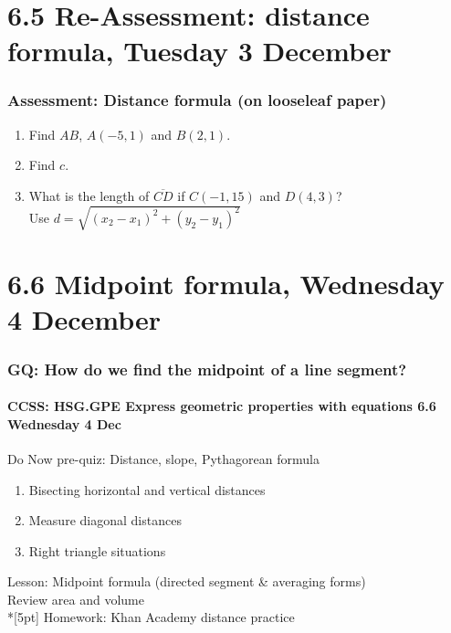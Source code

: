 \documentclass{beamer}
\begin{document}
  \section{6.5 Re-Assessment: distance formula, Tuesday 3 December}
  \frame
  {
    \frametitle{Assessment: Distance formula (on looseleaf paper)}
    \begin{enumerate}
      \item Find $AB$, $A(-5,1)$ and $B(2,1)$. \hspace{0.5cm}
         \vspace{1cm}
      \item Find $c$. \hspace{2cm}
         \vspace{0.5cm}
      \item What is the length of $\overline{CD}$ if $C(-1,15)$ and $D(4,3)$?\\[0.5cm]
        Use $\displaystyle d=\sqrt{(x_2-x_1)^2+(y_2-y_1)^2}$
    \end{enumerate}
  }

  \section{6.6 Midpoint formula, Wednesday 4 December}
  \frame
  {
    \frametitle{GQ: How do we find the midpoint of a line segment?}
    \framesubtitle{CCSS: HSG.GPE Express geometric properties with equations \hfill \alert{6.6 Wednesday 4 Dec}}

    \begin{block}{Do Now pre-quiz: Distance, slope, Pythagorean formula}
    \begin{enumerate}
      \item Bisecting horizontal and vertical distances
      \item Measure diagonal distances
      \item Right triangle situations
    \end{enumerate}
    \end{block}
    Lesson: Midpoint formula (directed segment \& averaging forms)\\
    Review area and volume \\*[5pt]
    Homework: Khan Academy distance practice
  }
\end{document}

